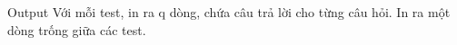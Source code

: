 Output  
Với mỗi test, in ra q dòng, chứa câu trả lời cho từng câu hỏi. In ra một dòng trống giữa các test.